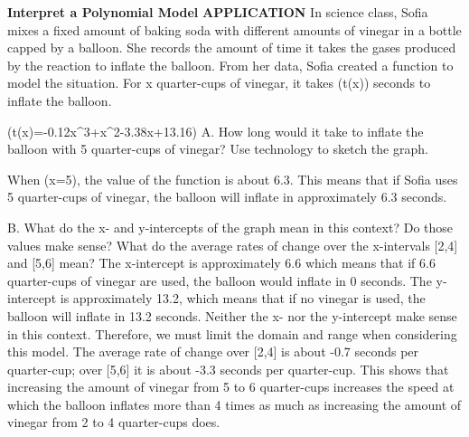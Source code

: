 \documentclass{article}
\newenvironment{example}[1]{}{}         %
\newcommand{\answer}[1]{}               %
\newcommand{\placeholder}[2]{}          %
\newcommand{\uncertain}[2]{#1}          %
\newcommand{\te}[1]{}                   %
\begin{document}
\begin{example}{5}
\textbf{Interpret a Polynomial Model}
\textbf{APPLICATION}
In science class, Sofia mixes a fixed amount of baking soda with different amounts of vinegar in a bottle capped by a balloon. She records the amount of time it takes the gases produced by the reaction to inflate the balloon.
From her data, Sofia created a function to model the situation. For x quarter-cups of vinegar, it takes (t(x)) seconds to inflate the balloon.
\placeholder{illustration}{Box labeled BAKING SODA and bottle labeled VINEGAR capped with an inflated red balloon; callout t(x)=-0.12x^3+x^2-3.38x+13.16.}
(t(x)=-0.12x^3+x^2-3.38x+13.16)
A. How long would it take to inflate the balloon with 5 quarter-cups of vinegar?
Use technology to sketch the graph.
\placeholder{graph}{Calculator display: decreasing orange cubic t(x)=-0.12x^3+x^2-3.38x+13.16 in first quadrant, flattening through middle then descending steeply to x-axis. Unnumbered axes, unit tick marks; visible x approximately 0 to 15, y 0 to 15. Red y-intercept label (0,12.16) and red x-intercept label (\uncertain{6.585}{5.585},0). Callouts: The y-intercept is about 13.2. Use technology to determine the value of the function when x=5. The x-intercept is about 6.6.}
\te{Printed graph y-intercept label appears as (0,12.16), while the equation and explanatory text use 13.16 and about 13.2.}
When (x=5), the value of the function is about 6.3. This means that if Sofia uses 5 quarter-cups of vinegar, the balloon will inflate in approximately 6.3 seconds.
\answer{A. approximately 6.3 seconds}
B. What do the x- and y-intercepts of the graph mean in this context? Do those values make sense? What do the average rates of change over the x-intervals [2,4] and [5,6] mean?
The x-intercept is approximately 6.6 which means that if 6.6 quarter-cups of vinegar are used, the balloon would inflate in 0 seconds.
The y-intercept is approximately 13.2, which means that if no vinegar is used, the balloon will inflate in 13.2 seconds.
Neither the x- nor the y-intercept make sense in this context. Therefore, we must limit the domain and range when considering this model.
The average rate of change over [2,4] is about -0.7 seconds per quarter-cup; over [5,6] it is about -3.3 seconds per quarter-cup. This shows that increasing the amount of vinegar from 5 to 6 quarter-cups increases the speed at which the balloon inflates more than 4 times as much as increasing the amount of vinegar from 2 to 4 quarter-cups does.
\answer{B. The intercepts do not make sense in this context; average rates of change are about -0.7 and -3.3 seconds per quarter-cup.}
\te{STUDY TIP Recall that when you are using a graph in a real-world context, you need to consider the context when thinking about domain and range. Does it make sense for x to be negative? Does it make sense for y to be negative?}
\end{example}
\end{document}

